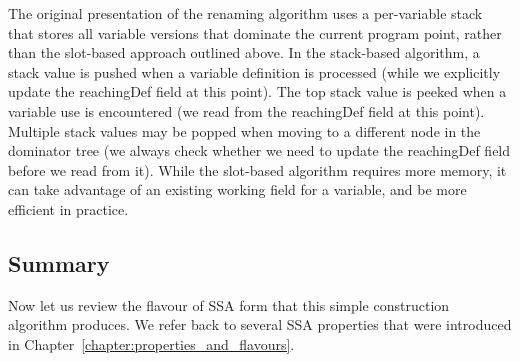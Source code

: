 {%
The original presentation of the renaming algorithm uses
a per-variable stack that stores
all variable versions that dominate the current program
point, rather than the slot-based approach outlined above.
%
In the stack-based algorithm, 
a stack value is pushed when a variable definition is
processed (while we explicitly update the reachingDef field at this point).
The top stack value is peeked when a variable use is encountered
(we read from the reachingDef field at this point).
Multiple stack values may be popped when moving to a different node
in the dominator tree 
(we always check whether we need to update the reachingDef field
before we read from it).
%
While the slot-based algorithm requires more memory, it can take advantage of 
an existing working field for a variable, and be more efficient in practice. 

\subsection{Summary}

Now let us review the flavour of SSA form that this simple
construction algorithm produces. We refer back to several
SSA properties that were introduced in
Chapter~\ref{chapter:properties_and_flavours}.

}
